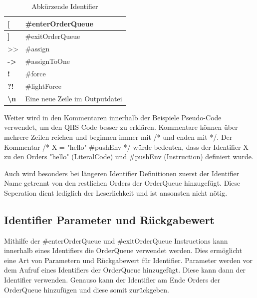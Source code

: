 {
\begin{table}[H]
    \centering
    \caption{Abkürzende Identifier}
    \vspace{3mm} %
    
    \begin{tabular}{>{\listingFont\selectfont}l|l}
    \textbf{{[}}                 & \#enterOrderQueue              \\ \hline
    \textbf{{]}}                 & \#exitOrderQueue               \\ \hline
    \textgreater{}\textgreater{} & \#assign                       \\ \hline
    \textbf{-\textgreater{}}     & \#assignToOne                  \\ \hline
    \textbf{!}                   & \#force                        \\ \hline
    \textbf{?!}                  & \#lightForce                   \\ \hline
    \textbf{\textbackslash{}n}   & Eine neue Zeile im Outputdatei
    \end{tabular}
\end{table}
}

Weiter wird in den Kommentaren innerhalb der Beispiele Pseudo-Code verwendet, um den QHS Code besser zu erklären. Kommentare können über mehrere Zeilen reichen und beginnen immer mit /* und enden mit */.
Der Kommentar /* X = "hello" \#pushEnv */ würde bedeuten, dass der Identifier X zu den Orders "hello" (LiteralCode) und \#pushEnv (Instruction) definiert wurde. 

Auch wird besonders bei längeren Identifier Definitionen zuerst der Identifier Name getrennt von den restlichen Orders der OrderQueue hinzugefügt. Diese Seperation dient lediglich der Leserlichkeit und ist ansonsten nicht nötig.

\subsection{Identifier Parameter und Rückgabewert}
Mithilfe der \#enterOrderQueue und \#exitOrderQueue Instructions kann innerhalb eines Identifiers die OrderQueue verwendet werden. Dies ermöglicht eine Art von Parametern und Rückgabewert für Identifier.
Parameter werden vor dem Aufruf eines Identifiers der OrderQueue hinzugefügt. Diese kann dann der Identifier verwenden. Genauso kann der Identifier am Ende Orders der OrderQueue hinzufügen und diese somit zurückgeben.

